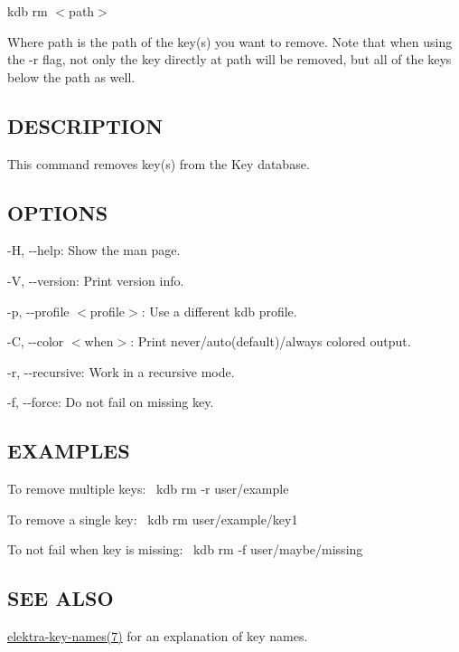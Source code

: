 {\ttfamily kdb rm $<$path$>$}

Where {\ttfamily path} is the path of the key(s) you want to remove. Note that when using the {\ttfamily -\/r} flag, not only the key directly at {\ttfamily path} will be removed, but all of the keys below the path as well.

\subsection*{D\+E\+S\+C\+R\+I\+P\+T\+I\+ON}

This command removes key(s) from the Key database.

\subsection*{O\+P\+T\+I\+O\+NS}


\begin{DoxyItemize}
\item {\ttfamily -\/H}, {\ttfamily -\/-\/help}\+: Show the man page.
\item {\ttfamily -\/V}, {\ttfamily -\/-\/version}\+: Print version info.
\item {\ttfamily -\/p}, {\ttfamily -\/-\/profile $<$profile$>$}\+: Use a different kdb profile.
\item {\ttfamily -\/C}, {\ttfamily -\/-\/color $<$when$>$}\+: Print never/auto(default)/always colored output.
\item {\ttfamily -\/r}, {\ttfamily -\/-\/recursive}\+: Work in a recursive mode.
\item {\ttfamily -\/f}, {\ttfamily -\/-\/force}\+: Do not fail on missing key.
\end{DoxyItemize}

\subsection*{E\+X\+A\+M\+P\+L\+ES}

To remove multiple keys\+:~\newline
 {\ttfamily kdb rm -\/r user/example}

To remove a single key\+:~\newline
 {\ttfamily kdb rm user/example/key1}

To not fail when key is missing\+:~\newline
 {\ttfamily kdb rm -\/f user/maybe/missing}

\subsection*{S\+EE A\+L\+SO}


\begin{DoxyItemize}
\item \hyperlink{md_doc_help_elektra-key-names_doc_help_elektra-key-names_md}{elektra-\/key-\/names(7)} for an explanation of key names. 
\end{DoxyItemize}